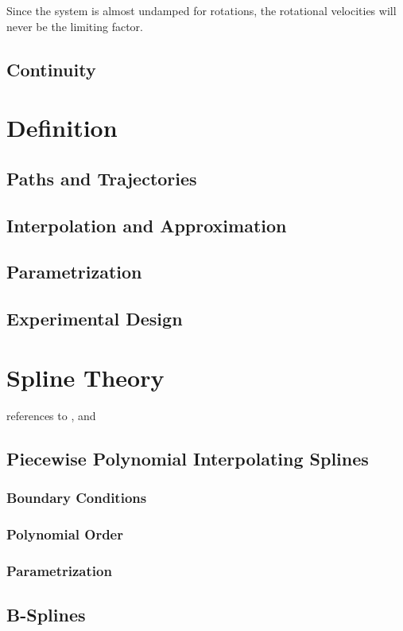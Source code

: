 Since the system is almost undamped for rotations, the rotational velocities will never be the limiting factor.





\subsection{Continuity}


\section{Definition}
\label{sec:definition}
\subsection{Paths and Trajectories}
\subsection{Interpolation and Approximation}
\subsection{Parametrization}
\subsection{Experimental Design}

\section{Spline Theory}
\label{sec:splineTheory}
references to \cite{engeln}, \cite{biagiotti} and \cite{doessegger}
\subsection{Piecewise Polynomial Interpolating Splines}
\subsubsection{Boundary Conditions}
\subsubsection{Polynomial Order}
\subsubsection{Parametrization}
\subsection{B-Splines}
